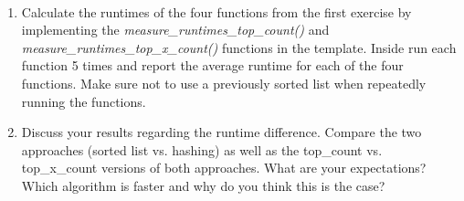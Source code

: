 \newpage
{} \\
\begin{enumerate}
	\item
	Calculate the runtimes of the four functions from the first exercise by implementing the \textit{measure\_runtimes\_top\_count()} and \textit{measure\_runtimes\_top\_x\_count()} functions in the template.
	Inside run each function 5 times and report the average runtime for each of the four functions. Make sure not to use a previously sorted list when repeatedly running the functions.
	
	\item
	Discuss your results regarding the runtime difference. Compare the two approaches (sorted list vs. hashing) as well as the top\_count vs. top\_x\_count versions of both approaches.
	What are your expectations? \\
	Which algorithm is faster and why do you think this is the case?
\end{enumerate}
